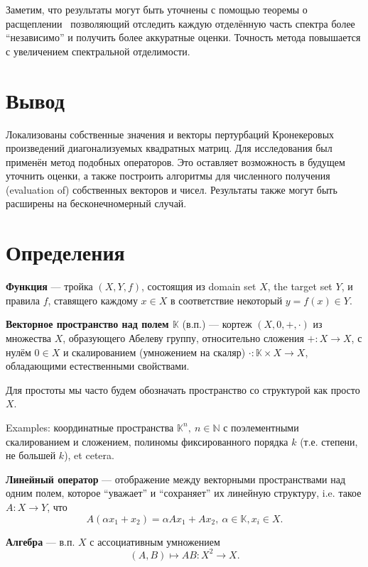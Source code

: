 \documentclass[14pt,a4paper]{extarticle}
\numberwithin{equation}{section}
\theoremstyle{definition}
\begin{document}
Заметим, что результаты могут быть уточнены с помощью теоремы о расщеплении~\cite{baskakov1987theorem}
позволяющий отследить каждую отделённую часть спектра более ``независимо''
и получить более аккуратные оценки.
Точность метода повышается с увеличением спектральной отделимости.

\section{Вывод}

Локализованы собственные значения и векторы пертурбаций Кронекеровых
произведений диагонализуемых квадратных матриц. Для исследования был применён
метод подобных операторов.
Это оставляет возможность в будущем уточнить оценки, а также построить алгоритмы
для численного получения (evaluation of) собственных векторов и чисел.
Результаты также могут быть расширены на бесконечномерный случай.

\newpage
\section*{Определения}

\textbf{Функция} --- тройка \( (X, Y, f) \), состоящия из domain set \( X \),
the target set \( Y \), и правила \( f \), ставящего каждому \( x\in X\)
в соответствие некоторый \( y=f(x)\in Y \).

\textbf{Векторное пространство над полем \(\mathbb{K}\)} (в.п.) --- кортеж \( (X, 0, +, \cdot) \)
из множества \( X \), образующего Абелеву группу, относительно сложения \(
+:X\to X\), с нулём \( 0\in X \)
и скалированием (умножением на скаляр)
\(\cdot: \mathbb{K}\times X \to X \), обладающими естественными свойствами.

Для простоты мы часто будем обозначать пространство со структурой как просто \( X \).

Examples: координатные пространства \( \mathbb{K}^n,\ n\in\mathbb{N} \) с поэлементными
скалированием и сложением, полиномы фиксированного порядка \( k \) (т.е.
степени, не большей \( k \)), et cetera.

\textbf{Линейный оператор} --- отображение между векторными пространствами над
одним полем,
которое ``уважает'' и ``сохраняет'' их линейную структуру, i.e. такое
\( A:X\to Y \), что
\[ A(\alpha x_1 + x_2) = \alpha Ax_1 + Ax_2,\
\alpha\in\mathbb{K}, x_i\in X. \]

\textbf{Алгебра} --- в.п. \( X \) с ассоциативным
умножением \[ (A, B)\mapsto AB: X^2\to X. \]
\end{document}
